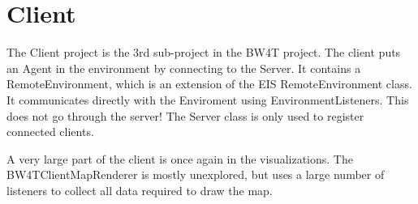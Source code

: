 \section*{Client}
The Client project is the 3rd sub-project in the BW4T project. The client puts an Agent in the  environment by connecting to the Server. It contains a RemoteEnvironment, which is an extension of the EIS RemoteEnvironment class. It communicates directly with the Enviroment using EnvironmentListeners. This does not go through the server! The Server class is only used to register connected clients. 

A very large part of the client is once again in the visualizations. The BW4TClientMapRenderer is mostly unexplored, but uses a large number of listeners to collect all data required to draw the map. 